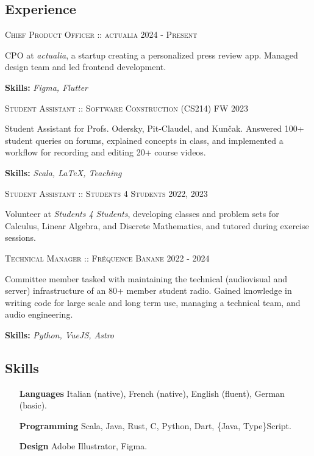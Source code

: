 \documentclass[11pt]{article}
\renewcommand{\line}[2]{{\vspace{4pt} \large \noindent\textsc{#1} \hfill \small{#2}}\vspace{0pt}}
\begin{document}
  \subsection*{Experience}

  \line{Chief Product Officer :: actualia}{2024 - \textsc{Present}}

  CPO at \textit{actualia}, a startup creating a personalized press review app. Managed design team and led frontend development.

  \textbf{Skills:} \textit{Figma, Flutter}
  \vspace{0.75em}

  \line{Student Assistant :: Software Construction (CS214)}{FW 2023}

  Student Assistant for Profs. Odersky, Pit-Claudel, and Kunčak. Answered 100+ student queries on forums, explained concepts in class, and implemented a workflow for recording and editing 20+ course videos.

  \textbf{Skills:} \textit{Scala, LaTeX, Teaching}
  \vspace{0.75em}

  \line{Student Assistant :: Students 4 Students}{2022, 2023}

  Volunteer at \textit{Students 4 Students}, developing classes and problem sets for Calculus, Linear Algebra, and Discrete Mathematics, and tutored during exercise sessions.
  \vspace{0.75em}

  \line{Technical Manager :: Fréquence Banane}{2022 - 2024}

  Committee member tasked with maintaining the technical (audiovisual and server) infrastructure of an 80+ member student radio. Gained knowledge in writing code for large scale and long term use, managing a technical team, and audio engineering.

  \textbf{Skills:} \textit{Python, VueJS, Astro}
  \subsection*{Skills}

  \begin{adjustwidth}{6em}{}
    \begin{itemize}
      \item[\textbf{Languages}] Italian (native), French (native), English (fluent), German (basic).
      \item[\textbf{Programming}] Scala, Java, Rust, C, Python, Dart, \{Java, Type\}Script.
      \item[\textbf{Design}] Adobe Illustrator, Figma.
    \end{itemize}
  \end{adjustwidth}
\end{document}
